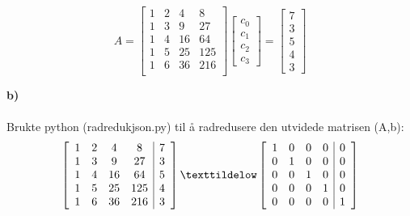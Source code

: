 \documentclass[12pt,norsk,a4paper]{article}
\begin{document}
        \[A = \left[ \begin{array}{cccc}
                                        1 & 2 & 4 & 8\\
                                        1 & 3 & 9 & 27\\
                                        1 & 4 & 16 & 64\\
                                        1 & 5 & 25 & 125\\
                                        1 & 6 & 36 & 216\\
                                    \end{array} \right]
            \left[ \begin{array}{c}
                                        c_0 \\ 
                                        c_1 \\ 
                                        c_2 \\ 
                                        c_3
                                    \end{array} \right]
            = \left[ \begin{array}{c}
                                        7 \\ 
                                        3 \\ 
                                        5 \\ 
                                        4\\
                                        3
                     \end{array} \right]\]
            


        \textbf{b)}\\\\
        Brukte python (radredukjson.py) til å radredusere den utvidede matrisen (A,b):\\
            \[\left[ \begin{array}{cccc|r}
                1 & 2 & 4 & 8 & 7\\
                1 & 3 & 9 & 27 & 3\\
                1 & 4 & 16 & 64 & 5\\
                1 & 5 & 25 & 125 & 4\\
                1 & 6 & 36 & 216 & 3\\
            \end{array} \right] \texttildelow
            \left[ \begin{array}{cccc|r}
                1 & 0 & 0 & 0 & 0\\
                0 & 1 & 0 & 0 & 0\\
                0 & 0 & 1 & 0 & 0\\
                0 & 0 & 0 & 1 & 0\\
                0 & 0 & 0 & 0 & 1\\
            \end{array} \right]
            \] 
        
\end{document}
